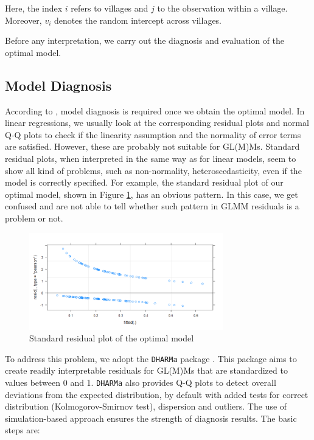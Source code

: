 \documentclass[11pt,twoside]{article}
\numberwithin{Theorem}{section}
\numberwithin{Definition}{section}
\numberwithin{Lemma}{section}
\numberwithin{Algorithm}{section}
\numberwithin{equation}{section}
\begin{document}
Here, the index $i$ refers to villages and $j$ to the observation within a village. Moreover, $v_i$ denotes the random intercept across villages.

Before any interpretation, we carry out the diagnosis and evaluation of the optimal model.

\subsection{Model Diagnosis} 

According to \cite{zuur2009mixed}, model diagnosis is required once we obtain the optimal model. In linear regressions, we usually look at the corresponding residual plots and normal Q-Q plots to check if the linearity assumption and the normality of error terms are satisfied. However, these are probably not suitable for GL(M)Ms. Standard residual plots, when interpreted in the same way as for linear models, seem to show all kind of problems, such as non-normality, heteroscedasticity, even if the model is correctly specified. For example, the standard residual plot of our optimal model, shown in Figure \ref{fig:std_resplot}, has an obvious pattern. In this case, we get confused and are not able to tell whether such pattern in GLMM residuals is a problem or not.

\begin{figure}[!h]
	\centering
	\includegraphics[width = 0.75\textwidth]{Images/std_resplot.png}
	\caption{Standard residual plot of the optimal model}
	\label{fig:std_resplot}
\end{figure}

To address this problem, we adopt the \texttt{DHARMa} package \cite{dharma}. This package aims to create readily interpretable residuals for GL(M)Ms that are standardized to values between 0 and 1. \texttt{DHARMa} also provides Q-Q plots to detect overall deviations from the expected distribution, by default with added tests for correct distribution (Kolmogorov-Smirnov test), dispersion and outliers. The use of simulation-based approach ensures the strength of diagnosis results. The basic steps \cite{dharma} are:
\end{document}
